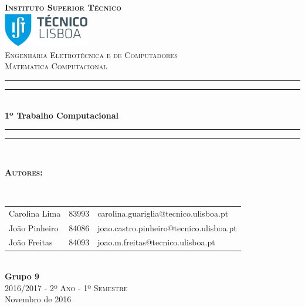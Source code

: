 \documentclass[12pt]{article}
\begin{document}
\begin{titlepage}

\thispagestyle{empty}
\newcommand{\HRule}{\rule{\linewidth}{0.5mm}} %
\center
\textsc{\bfseries\LARGE Instituto Superior Técnico}\\[1cm] %
\includegraphics[height=1.5cm]{IST_Logo.pdf}\\[2.5cm]
\textsc{\Large Engenharia Eletrotécnica e de Computadores}\\[0.5cm] %
\textsc{\large Matematica Computacional }\\[0.5cm] %

\rule{\textwidth}{1.6pt}\vspace*{-\baselineskip}\vspace*{2pt} %
\rule{\textwidth}{0.4pt}\\[\baselineskip] %

{\Huge \bfseries 1º Trabalho Computacional}\\[0.2cm]

\rule{\textwidth}{0.4pt}\vspace*{-\baselineskip}\vspace{3.2pt} %
\rule{\textwidth}{1.6pt}\\[1.5cm]


\begin{minipage}{0.9\textwidth}
	\begin{flushleft} \large
		\begin{Large}\bfseries\textsc{Autores:}\end{Large}\\[0.4cm]
		\begin{tabular}{l l l}

			Carolina Lima & 83993 & \normalsize carolina.guariglia@tecnico.ulisboa.pt \\
			João Pinheiro & 84086 & \normalsize joao.castro.pinheiro@tecnico.ulisboa.pt \\
			João Freitas & 84093 & \normalsize joao.m.freitas@tecnico.ulisboa.pt \\

		\end{tabular}
	\end{flushleft}
\end{minipage}\\[0.5cm]


{\bfseries Grupo 9}\\[2cm]
\large\textsc{ 2016/2017 - 2º Ano - 1º Semestre}\\
\large Novembro de 2016\\[1cm]


\end{titlepage}
\end{document}
